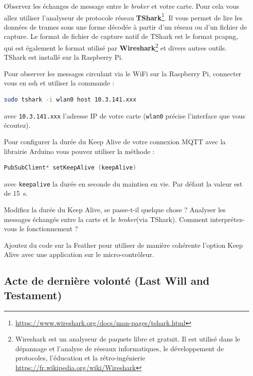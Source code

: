 \documentclass[11pt]{paper}
\newcommand\rasp{Raspberry Pi\xspace}
\newcommand\broker{{\it broker}\xspace}
\begin{document}
Observez les échanges de message entre le \broker et votre carte. Pour cela vous allez utiliser l'analyseur de protocole réseau {\bf TShark}\footnote{\href{https://www.wireshark.org/docs/man-pages/tshark.html}{https://www.wireshark.org/docs/man-pages/tshark.html}}. Il vous permet de lire les données de trames sous une forme décodée à partir d'un réseau ou d'un fichier de capture. Le format de fichier de capture natif de TShark est le format pcapng, qui est également le format utilisé par {\bf Wireshark}\footnote{Wireshark est un analyseur de paquets libre et gratuit. Il est utilisé dans le dépannage et l’analyse de réseaux informatiques, le développement de protocoles, l’éducation et la rétro-ingénierie \href{https://fr.wikipedia.org/wiki/Wireshark}{https://fr.wikipedia.org/wiki/Wireshark}} et divers autres outils. TShark est installé sur la \rasp.

Pour observer les messages circulant via le WiFi sur la \rasp, connecter vous en ssh et utiliser la commande :
\begin{lstlisting}[language=bash] 
sudo tshark -i wlan0 host 10.3.141.xxx
\end{lstlisting}
avec {\tt 10.3.141.xxx} l'adresse IP de votre carte ({\tt wlan0} précise l'interface que vous écoutez).

Pour configurer la durée du Keep Alive de votre connexion MQTT avec la librairie Arduino vous pouvez utiliser la méthode :
\begin{lstlisting}[language=C] 
PubSubClient* setKeepAlive (keepAlive)
\end{lstlisting}
avec {\tt keepalive} la durée en seconde du maintien en vie. Par défaut la valeur est de 15~s.

Modifiez la durée du Keep Alive, se passe-t-il quelque chose ? Analyser les messages échangés entre la carte et le \broker (via TShark). Comment interprétez-vous le fonctionnement ?

Ajoutez du code sur la Feather pour utiliser de manière cohérente l'option Keep Alive avec une application sur le micro-contrôleur.\\


\subsection{Acte de dernière volonté (Last Will and Testament)}
\end{document}
